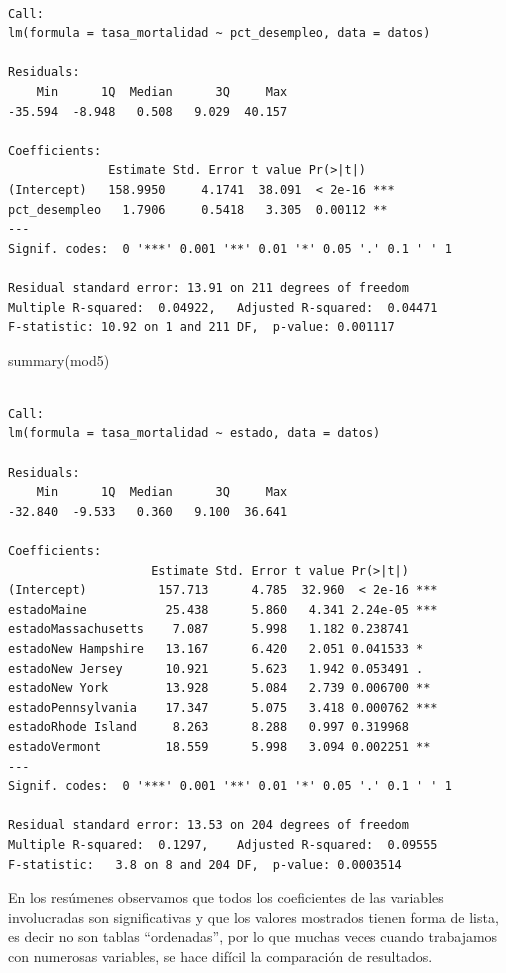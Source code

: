 \documentclass[
  spanish,
  a4paper,
]{scrbook}
\newenvironment{Shaded}{\begin{snugshade}}{\end{snugshade}}
\newcommand{\FunctionTok}[1]{\textcolor[rgb]{0.28,0.35,0.67}{#1}}
\newcommand{\NormalTok}[1]{\textcolor[rgb]{0.00,0.23,0.31}{#1}}
\begin{document}
\begin{verbatim}

Call:
lm(formula = tasa_mortalidad ~ pct_desempleo, data = datos)

Residuals:
    Min      1Q  Median      3Q     Max 
-35.594  -8.948   0.508   9.029  40.157 

Coefficients:
              Estimate Std. Error t value Pr(>|t|)    
(Intercept)   158.9950     4.1741  38.091  < 2e-16 ***
pct_desempleo   1.7906     0.5418   3.305  0.00112 ** 
---
Signif. codes:  0 '***' 0.001 '**' 0.01 '*' 0.05 '.' 0.1 ' ' 1

Residual standard error: 13.91 on 211 degrees of freedom
Multiple R-squared:  0.04922,   Adjusted R-squared:  0.04471 
F-statistic: 10.92 on 1 and 211 DF,  p-value: 0.001117
\end{verbatim}

\begin{Shaded}
\begin{Highlighting}[]
\FunctionTok{summary}\NormalTok{(mod5)}
\end{Highlighting}
\end{Shaded}

\begin{verbatim}

Call:
lm(formula = tasa_mortalidad ~ estado, data = datos)

Residuals:
    Min      1Q  Median      3Q     Max 
-32.840  -9.533   0.360   9.100  36.641 

Coefficients:
                    Estimate Std. Error t value Pr(>|t|)    
(Intercept)          157.713      4.785  32.960  < 2e-16 ***
estadoMaine           25.438      5.860   4.341 2.24e-05 ***
estadoMassachusetts    7.087      5.998   1.182 0.238741    
estadoNew Hampshire   13.167      6.420   2.051 0.041533 *  
estadoNew Jersey      10.921      5.623   1.942 0.053491 .  
estadoNew York        13.928      5.084   2.739 0.006700 ** 
estadoPennsylvania    17.347      5.075   3.418 0.000762 ***
estadoRhode Island     8.263      8.288   0.997 0.319968    
estadoVermont         18.559      5.998   3.094 0.002251 ** 
---
Signif. codes:  0 '***' 0.001 '**' 0.01 '*' 0.05 '.' 0.1 ' ' 1

Residual standard error: 13.53 on 204 degrees of freedom
Multiple R-squared:  0.1297,    Adjusted R-squared:  0.09555 
F-statistic:   3.8 on 8 and 204 DF,  p-value: 0.0003514
\end{verbatim}

En los resúmenes observamos que todos los coeficientes de las variables
involucradas son significativas y que los valores mostrados tienen forma
de lista, es decir no son tablas ``ordenadas'', por lo que muchas veces
cuando trabajamos con numerosas variables, se hace difícil la
comparación de resultados.
\end{document}

